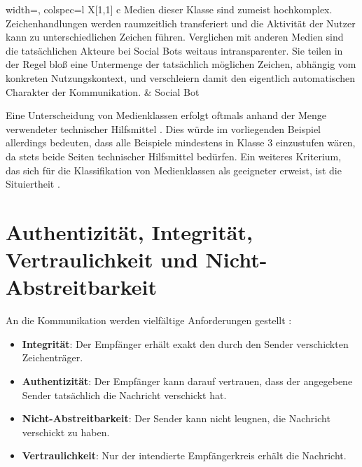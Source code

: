 \begin{university-long-table}[
    caption={Medienklassen am Beispiel von Social Bots, Chat Rooms und Online Foren},
    label={tab:01-02_media-classes-examples}
]{
    width=\textwidth, 
    colspec={l X[1,1] c}
}
            Medien dieser Klasse sind zumeist hochkomplex. Zeichenhandlungen werden raumzeitlich transferiert und die Aktivität der Nutzer kann zu unterschiedlichen Zeichen führen. \cite[S. 68]{001_MKO02_media-as-means-of-communication} \newline
            Verglichen mit anderen Medien sind die tatsächlichen Akteure bei Social Bots weitaus intransparenter. Sie teilen in der Regel bloß eine Untermenge der tatsächlich möglichen Zeichen, abhängig vom konkreten Nutzungskontext, und verschleiern damit den eigentlich automatischen Charakter der Kommunikation. &
            Social Bot\\
\end{university-long-table}

Eine Unterscheidung von Medienklassen erfolgt oftmals anhand der Menge verwendeter technischer Hilfsmittel \cite[S. 8]{001_MKO02_media-as-means-of-communication}. Dies würde im vorliegenden Beispiel allerdings bedeuten, dass alle Beispiele mindestens in Klasse 3 einzustufen wären, da stets beide Seiten technischer Hilfsmittel bedürfen. Ein weiteres Kriterium, das sich für die Klassifikation von Medienklassen als geeigneter erweist, ist die Situiertheit \cite[S. 40]{001_MKO02_media-as-means-of-communication}.

\pagebreak

\section{Authentizität, Integrität, Vertraulichkeit und Nicht-Abstreitbarkeit}
\label{sec:01-03_authenticity-integrity-confidentiality-and-non-repudiation}

An die Kommunikation werden vielfältige Anforderungen gestellt \cite[S. 42 f.]{001_MKO02_media-as-means-of-communication}:
\begin{itemize}
    \item \textbf{Integrität}: Der Empfänger erhält exakt den durch den Sender verschickten Zeichenträger.
    \item \textbf{Authentizität}: Der Empfänger kann darauf vertrauen, dass der angegebene Sender tatsächlich die Nachricht verschickt hat.
    \item \textbf{Nicht-Abstreitbarkeit}: Der Sender kann nicht leugnen, die Nachricht verschickt zu haben.
    \item \textbf{Vertraulichkeit}: Nur der intendierte Empfängerkreis erhält die Nachricht.
\end{itemize}

